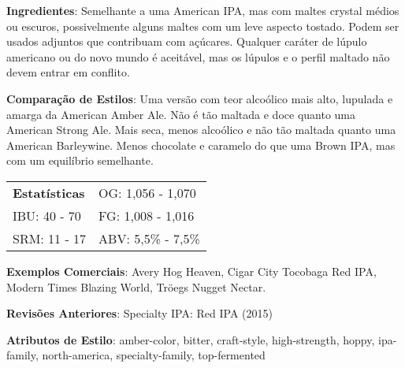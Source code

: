 \textbf{Ingredientes}: Semelhante a uma American IPA, mas com maltes crystal médios ou escuros, possivelmente alguns maltes com um leve aspecto tostado. Podem ser usados adjuntos que contribuam com açúcares. Qualquer caráter de lúpulo americano ou do novo mundo é aceitável, mas os lúpulos e o perfil maltado não devem entrar em conflito.

\textbf{Comparação de Estilos}: Uma versão com teor alcoólico mais alto, lupulada e amarga da American Amber Ale. Não é tão maltada e doce quanto uma American Strong Ale. Mais seca, menos alcoólico e não tão maltada quanto uma American Barleywine. Menos chocolate e caramelo do que uma Brown IPA, mas com um equilíbrio semelhante.

\begin{tabular}{@{}p{35mm}p{35mm}@{}}
  \textbf{Estatísticas} & OG: 1,056 - 1,070 \\
  IBU: 40 - 70  & FG: 1,008 - 1,016 \\
  SRM: 11 - 17  & ABV: 5,5\% - 7,5\%
\end{tabular}

\textbf{Exemplos Comerciais}: Avery Hog Heaven, Cigar City Tocobaga Red IPA, Modern Times Blazing World, Tröegs Nugget Nectar.

\textbf{Revisões Anteriores}: Specialty IPA: Red IPA (2015)

\textbf{Atributos de Estilo}: amber-color, bitter, craft-style, high-strength, hoppy, ipa-family, north-america, specialty-family, top-fermented

